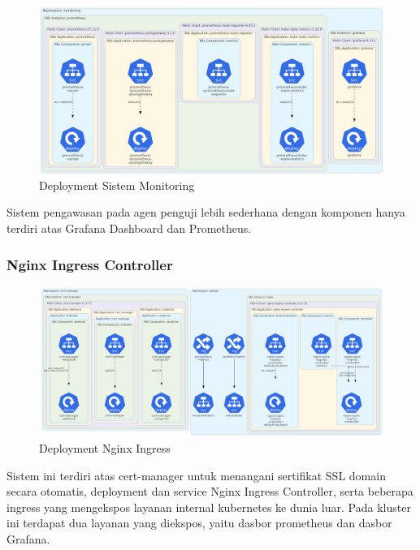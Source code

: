 \begin{figure}[htbp]
    \centering
    \includegraphics[width=1\textwidth]{resources/chapter-4/agent-monitoring.png}
    \caption{Deployment Sistem Monitoring}
    \label{fig:deployment-monitoring-agent}
\end{figure}

Sistem pengawasan pada agen penguji lebih sederhana dengan komponen hanya terdiri atas Grafana Dashboard dan Prometheus.

\pagebreak

\subsubsection{Nginx Ingress Controller}

\begin{figure}[htbp]
    \centering
    \includegraphics[width=1\textwidth]{resources/chapter-4/agent-nginx.png}
    \caption{Deployment Nginx Ingress}
    \label{fig:deployment-nginx-agent}
\end{figure}

Sistem ini terdiri atas cert-manager untuk menangani sertifikat SSL domain secara otomatis, deployment dan service Nginx Ingress Controller, serta beberapa ingress yang mengekspos layanan internal kubernetes ke dunia luar. Pada kluster ini terdapat dua layanan yang diekspos, yaitu dasbor prometheus dan dasbor Grafana.

